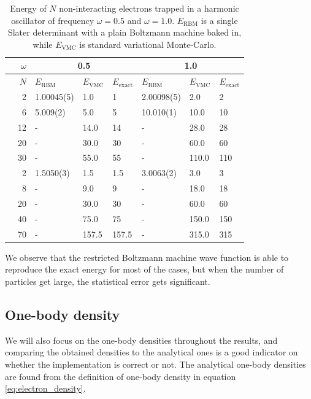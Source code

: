 \begin{table} [H]
	\caption{Energy of $N$ non-interacting electrons trapped in a harmonic oscillator of frequency $\omega=0.5$ and $\omega=1.0$. $E_{\text{RBM}}$ is a single Slater determinant with a plain Boltzmann machine baked in, while $E_{\text{VMC}}$ is standard variational Monte-Carlo.}
	\label{tab:quantumdotswointeraction}
	\begin{tabularx}{\textwidth}{r|r|XXX:XXX} \hline\hline
		\label{tab:nn}
		& $\omega$ & &\\ \hline
		& $N$ & $E_{\text{RBM}}$ & $E_{\text{VMC}}$ & $E_{\text{exact}}$ & $E_{\text{RBM}}$ & $E_{\text{VMC}}$ & $E_{\text{exact}}$ \\ \hline
		
		\parbox[t]{2mm}{}
		&2 & 1.00045(5) & 1.0 & 1 & 2.00098(5) & 2.0 & 2\\
		&6 & 5.009(2) & 5.0 & 5 & 10.010(1) & 10.0 & 10 \\
		&12 & - & 14.0 & 14 & - & 28.0 & 28\\
		&20 & - & 30.0 & 30 & - & 60.0 & 60\\
		&30 & - & 55.0 & 55 & - & 110.0 & 110\\ \hline
		
		\parbox[t]{2mm}{}
		&2 & 1.5050(3) & 1.5 & 1.5 & 3.0063(2) & 3.0 & 3 \\
		&8 & - & 9.0 & 9 & - & 18.0 & 18 \\
		&20 & - & 30.0 & 30 & - & 60.0 & 60 \\
		&40 & - & 75.0 & 75 & - & 150.0 & 150 \\
		&70 & - & 157.5 & 157.5 & - & 315.0 & 315 \\ \hline\hline
	\end{tabularx}
\end{table}
We observe that the restricted Boltzmann machine wave function is able to reproduce the exact energy for most of the cases, but when the number of particles get large, the statistical error gets significant.

\subsection{One-body density}
We will also focus on the one-body densities throughout the results, and comparing the obtained densities to the analytical ones is a good indicator on whether the implementation is correct or not. The analytical one-body densities are found from the definition of one-body density in equation \eqref{eq:electron_density}.

